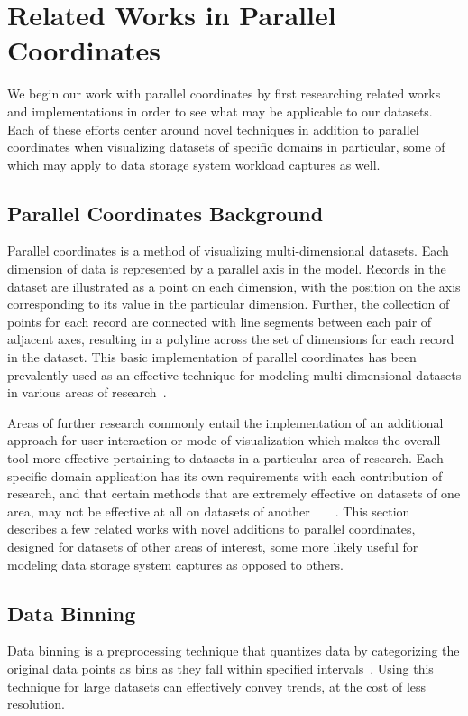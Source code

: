 \documentclass[journal]{vgtc}                %
\begin{document}
\section{Related Works in Parallel Coordinates}
\label{related-works}

We begin our work with parallel coordinates by first researching related works and implementations in order to see what may be applicable to our datasets. Each of these efforts center around novel techniques in addition to parallel coordinates when visualizing datasets of specific domains in particular, some of which may apply to data storage system workload captures as well.

\subsection{Parallel Coordinates Background}
\label{background}

Parallel coordinates is a method of visualizing multi-dimensional datasets. Each dimension of data is represented by a parallel axis in the model. Records in the dataset are illustrated as a point on each dimension, with the position on the axis corresponding to its value in the particular dimension. Further, the collection of points for each record are connected with line segments between each pair of adjacent axes, resulting in a polyline across the set of dimensions for each record in the dataset. This basic implementation of parallel coordinates has been prevalently used as an effective technique for modeling multi-dimensional datasets in various areas of research~\cite{Inselberg:1990:PCT:949531.949588}.

Areas of further research commonly entail the implementation of an additional approach for user interaction or mode of visualization which makes the overall tool more effective pertaining to datasets in a particular area of research. Each specific domain application has its own requirements with each contribution of research, and that certain methods that are extremely effective on datasets of one area, may not be effective at all on datasets of another~\cite{novotny:2006:OPFC}~\cite{johansson:2007:DCDTPC}~\cite{peng:2005:CRMD}~\cite{Graham:2003:UCE}. This section describes a few related works with novel additions to parallel coordinates, designed for datasets of other areas of interest, some more likely useful for modeling data storage system captures as opposed to others.

\subsection{Data Binning}
\label{data_binning}
Data binning is a preprocessing technique that quantizes data by categorizing the original data points as bins as they fall within specified intervals~\cite{website:binning}. Using this technique for large datasets can effectively convey trends, at the cost of less resolution.
\end{document}
